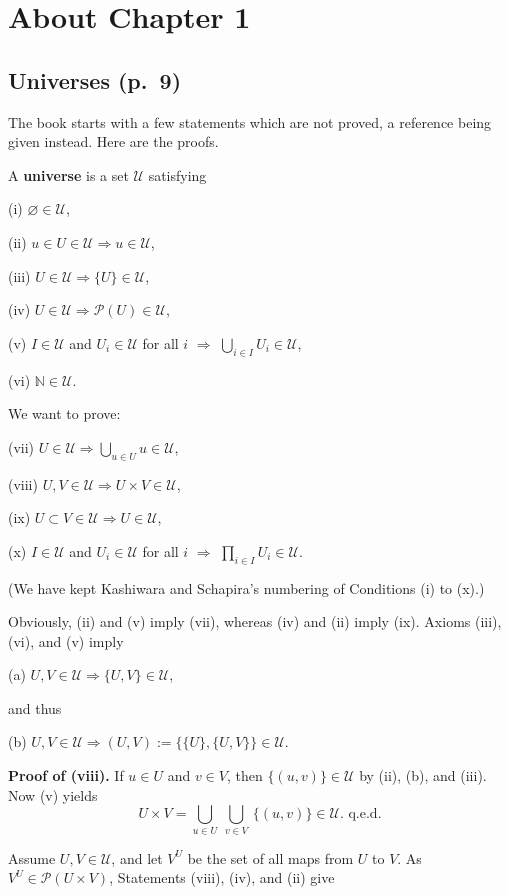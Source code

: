\documentclass[12pt]{article}
\theoremstyle{remark}
\theoremstyle{definition}
\newcommand{\nn}{\noindent}
\newcommand{\then}{\Rightarrow}
\begin{document}
\section{About Chapter 1}

\subsection{Universes (p.~9)}

The book starts with a few statements which are not proved, a reference being given instead. Here are the proofs.

A \textbf{universe} is a set $\mathcal U$ satisfying 

(i) $\varnothing\in\mathcal U$,

(ii) $u\in U\in\mathcal U\then u\in \mathcal U$,

(iii) $U\in\mathcal U\then\{U\}\in\mathcal U$,

(iv) $U\in\mathcal U\then\mathcal P(U)\in\mathcal U$,

(v) $I\in\mathcal U$ and $U_i\in\mathcal U$ for all $i$ $\then$ $\bigcup_{i\in I}U_i\in\mathcal U$,

(vi) $\mathbb N\in\mathcal U$.

\nn We want to prove:

(vii) $U\in\mathcal U\then\bigcup_{u\in U}u\in\mathcal U$,

(viii) $U,V\in\mathcal U\then U\times V\in\mathcal U$,

(ix) $U\subset V\in\mathcal U\then U\in\mathcal U$,

(x) $I\in \mathcal U$ and $U_i\in\mathcal U$ for all $i$ $\then$ $\prod_{i\in I}U_i\in\mathcal U$.

\nn(We have kept Kashiwara and Schapira's numbering of Conditions (i) to (x).) 

\nn Obviously, (ii) and (v) imply (vii), whereas (iv) and (ii) imply (ix). Axioms (iii), (vi), and (v) imply

(a) $U,V\in\mathcal U\then\{U,V\}\in\mathcal U$,

\nn and thus

(b) $U,V\in\mathcal U\then(U,V):=\{\{U\},\{U,V\}\}\in\mathcal U$.

\nn\textbf{Proof of (viii).} If $u\in U$ and $v\in V$, then $\{(u,v)\}\in\mathcal U$ by (ii), (b), and (iii). Now (v) yields 
$$
U\times V=\bigcup_{u\in U}\ \bigcup_{v\in V}\ \{(u,v)\}\in\mathcal U.\text{ q.e.d.} 
$$ 

Assume $U,V\in\mathcal U$, and let $V^U$ be the set of all maps from $U$ to $V$. As $V^U\in\mathcal P(U\times V)$, Statements (viii), (iv), and (ii) give
\end{document}
